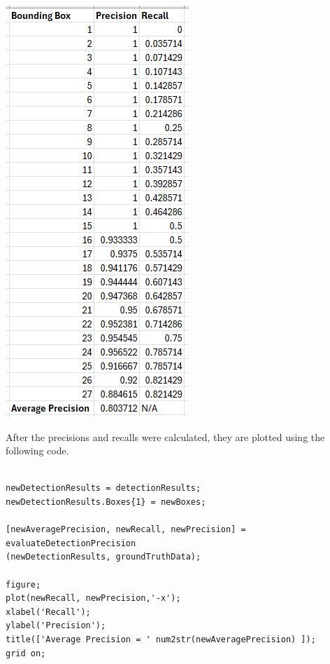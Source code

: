 \documentclass[man]{apa7}
\begin{document}
\newpage

\begin{minipage}{\linewidth}
  \includegraphics[]{figures/finalPrecRec.png}
  \label{fig:pProcessedPrecRec}
\end{minipage}

After the precisions and recalls were calculated, they are plotted using the following code.

\newpage

\begin{lstlisting}[]

newDetectionResults = detectionResults;
newDetectionResults.Boxes{1} = newBoxes;

[newAveragePrecision, newRecall, newPrecision] = evaluateDetectionPrecision
(newDetectionResults, groundTruthData);

figure;
plot(newRecall, newPrecision,'-x');
xlabel('Recall');
ylabel('Precision');
title(['Average Precision = ' num2str(newAveragePrecision) ]);
grid on;

\end{lstlisting}
\end{document}
